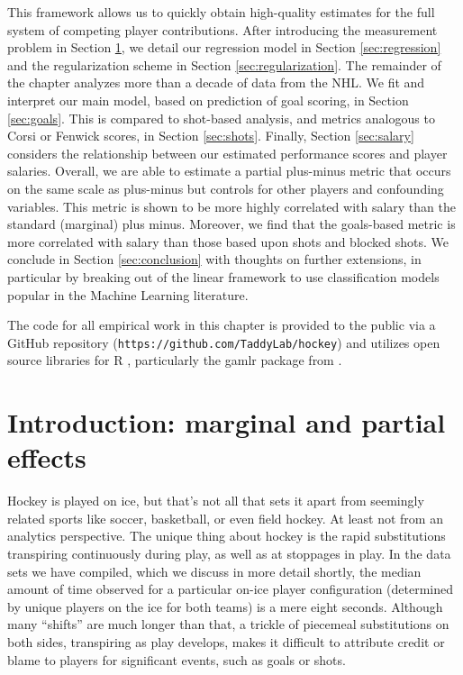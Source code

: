 This framework allows us to quickly obtain high-quality estimates for the full
system of competing player contributions. After introducing the  measurement
problem in Section \ref{sec:intro}, we detail our regression model in Section
\ref{sec:regression} and the regularization scheme in Section
\ref{sec:regularization}.  The remainder of the chapter analyzes more than a
decade of data from the NHL.  We fit and interpret our main model, based on
prediction of goal scoring, in Section \ref{sec:goals}.  This is compared to
shot-based analysis, and metrics analogous to Corsi or Fenwick scores, in
Section \ref{sec:shots}.  Finally, Section \ref{sec:salary} considers the
relationship between our estimated  performance scores and  player salaries.
Overall, we are able to estimate a partial plus-minus metric that occurs on
the same scale as plus-minus but controls for other players and confounding
variables.  This metric is shown to be more highly correlated with salary than
the standard (marginal) plus minus.  Moreover, we find that the goals-based
metric is more correlated with salary than those based upon shots and blocked
shots.   We conclude in Section \ref{sec:conclusion} with thoughts on further
extensions, in particular by breaking out of the linear framework to use
classification models popular in the Machine Learning literature.

The code for all empirical work in this chapter is provided to the public via a GitHub
repository (\verb!https://github.com/TaddyLab/hockey!) and utilizes open
source libraries for {\sf R} \cite{cranR}, particularly the {\sf gamlr} \cite{gamlr} package from \cite{taddy_one-step_2015}.


\section{Introduction: marginal and partial effects}
\label{sec:intro}

Hockey is played on ice, but that's not all that sets it apart from seemingly
related  sports like soccer, basketball, or even field hockey.  At least not
from an analytics perspective.  The unique thing about hockey is the rapid
substitutions transpiring continuously during play, as well as at stoppages in
play.  In the data sets we have compiled, which we discuss in more detail
shortly, the median amount of time observed for a particular on-ice player
configuration (determined by unique players on the ice for both teams) is a
mere eight seconds. Although many ``shifts'' are much longer than that, a
trickle of piecemeal substitutions on both sides, transpiring as play
develops, makes it difficult to attribute credit or blame to players for
significant events, such as goals or shots.

